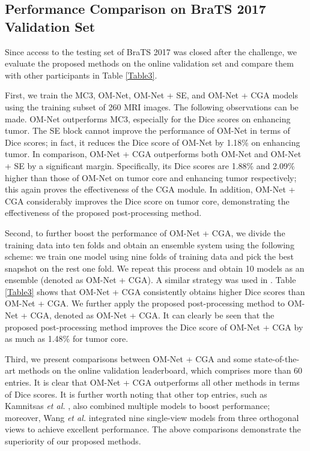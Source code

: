 \documentclass[journal,twoside]{IEEEtran}
\begin{document}
\subsection{Performance Comparison on BraTS 2017 Validation Set}
Since access to the testing set of BraTS 2017 was closed after the challenge, we evaluate the proposed methods on the online validation set and compare them with other participants in Table \ref{Table3}. 




First, we train the MC3, OM-Net, OM-Net + SE, and OM-Net + CGA models using the training subset of 260 MRI images. The following observations can be made. OM-Net outperforms MC3, especially for the Dice scores on enhancing tumor. The SE block cannot improve the performance of OM-Net in terms of Dice scores; in fact, it reduces the Dice score of OM-Net by 1.18\% on enhancing tumor. In comparison, OM-Net + CGA outperforms both OM-Net and OM-Net + SE by a significant margin. Specifically, its Dice scores are 1.88\% and 2.09\% higher than those of OM-Net on tumor core and enhancing tumor respectively; this again proves the effectiveness of the CGA module. In addition, OM-Net + CGA considerably improves the Dice score on tumor core, demonstrating the effectiveness of the proposed post-processing method.




Second, to further boost the performance of OM-Net + CGA, we divide the training data into ten folds and obtain an ensemble system using the following scheme: we train one model using nine folds of training data and pick the best snapshot on the rest one fold. We repeat this process and obtain 10 models as an ensemble (denoted as OM-Net + CGA). A similar strategy was used in \cite{isensee2018no}. Table \ref{Table3} shows that OM-Net + CGA consistently obtains higher Dice scores than OM-Net + CGA. We further apply the proposed post-processing method to OM-Net + CGA, denoted as OM-Net + CGA. It can clearly be seen that the proposed post-processing method improves the Dice score of OM-Net + CGA  by as much as 1.48\% for tumor core. 



Third, we present comparisons between OM-Net + CGA and some state-of-the-art methods on the online validation leaderboard, which comprises more than 60 entries. It is clear that OM-Net + CGA outperforms all other methods in terms of Dice scores. It is further worth noting that other top entries, such as Kamnitsas \emph{et al.} \cite{kamnitsas2017ensembles}, also combined multiple models to boost performance; moreover, Wang \emph{et al.} \cite{wang2017automatic} integrated nine single-view models from three orthogonal views to achieve excellent performance. The above comparisons demonstrate the superiority of our proposed methods.
\end{document}
